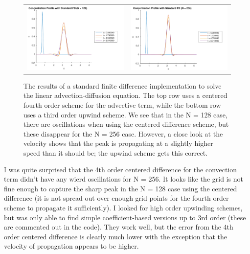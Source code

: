 \documentclass{article}
\begin{document}
\begin{figure}[!ht]
\begin{tabular}{c c}
\includegraphics[scale=0.5]{p2a_128_u3.pdf} & \includegraphics[scale=0.5]{p2a_256_u3.pdf}
\end{tabular}
\caption{The results of a standard finite difference implementation to solve the linear advection-diffusion equation.
The top row uses a centered fourth order scheme for the advective term, while the bottom row uses a third order upwind scheme.
We see that in the N = 128 case, there are oscillations when using the centered difference scheme, but these disappear for the N = 256 case.
However, a close look at the velocity shows that the peak is propagating at a slightly higher speed than it should be; the upwind scheme gets this correct.
}
\label{fig:standard-fd}
\end{figure}

I was quite surprised that the 4th order centered difference for the convection term didn't have any wierd oscillations for N = 256.
It looks like the grid is not fine enough to capture the sharp peak in the N = 128 case using the centered difference (it is not spread out over enough grid points for the fourth order scheme to propagate it sufficiently).
I looked for high order upwinding schemes, but was only able to find simple coefficient-based versions up to 3rd order (these are commented out in the code).
They work well, but the error from the 4th order centered difference is clearly much lower with the exception that the velocity of propagation appears to be higher.
\end{document}
